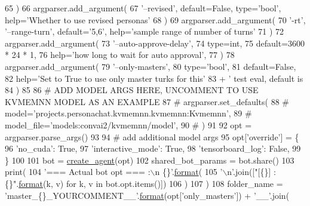 \begin{DoxyCode}
65     )
66     argparser.add\_argument(
67         \textcolor{stringliteral}{'--revised'}, default=\textcolor{keyword}{False}, type=\textcolor{stringliteral}{'bool'}, help=\textcolor{stringliteral}{'Whether to use revised personas'}
68     )
69     argparser.add\_argument(
70         \textcolor{stringliteral}{'-rt'}, \textcolor{stringliteral}{'--range-turn'}, default=\textcolor{stringliteral}{'5,6'}, help=\textcolor{stringliteral}{'sample range of number of turns'}
71     )
72     argparser.add\_argument(
73         \textcolor{stringliteral}{'--auto-approve-delay'},
74         type=int,
75         default=3600 * 24 * 1,
76         help=\textcolor{stringliteral}{'how long to wait for auto approval'},
77     )
78     argparser.add\_argument(
79         \textcolor{stringliteral}{'--only-masters'},
80         type=\textcolor{stringliteral}{'bool'},
81         default=\textcolor{keyword}{False},
82         help=\textcolor{stringliteral}{'Set to True to use only master turks for this'}
83         + \textcolor{stringliteral}{' test eval, default is %
84     )
85 
86     \textcolor{comment}{# ADD MODEL ARGS HERE, UNCOMMENT TO USE KVMEMNN MODEL AS AN EXAMPLE}
87     \textcolor{comment}{# argparser.set\_defaults(}
88     \textcolor{comment}{#     model='projects.personachat.kvmemnn.kvmemnn:Kvmemnn',}
89     \textcolor{comment}{#     model\_file='models:convai2/kvmemnn/model',}
90     \textcolor{comment}{# )}
91 
92     opt = argparser.parse\_args()
93 
94     \textcolor{comment}{# add additional model args}
95     opt[\textcolor{stringliteral}{'override'}] = \{
96         \textcolor{stringliteral}{'no\_cuda'}: \textcolor{keyword}{True},
97         \textcolor{stringliteral}{'interactive\_mode'}: \textcolor{keyword}{True},
98         \textcolor{stringliteral}{'tensorboard\_log'}: \textcolor{keyword}{False},
99     \}
100 
101     bot = \hyperlink{namespaceparlai_1_1core_1_1agents_ad0d54074d4bcc148bb415ab5515a53b5}{create\_agent}(opt)
102     shared\_bot\_params = bot.share()
103     print(
104         \textcolor{stringliteral}{'=== Actual bot opt === :\(\backslash\)n \{\}'}.\hyperlink{namespaceparlai_1_1chat__service_1_1services_1_1messenger_1_1shared__utils_a32e2e2022b824fbaf80c747160b52a76}{format}(
105             \textcolor{stringliteral}{'\(\backslash\)n'}.join([\textcolor{stringliteral}{"[\{\}] : \{\}"}.\hyperlink{namespaceparlai_1_1chat__service_1_1services_1_1messenger_1_1shared__utils_a32e2e2022b824fbaf80c747160b52a76}{format}(k, v) \textcolor{keywordflow}{for} k, v \textcolor{keywordflow}{in} bot.opt.items()])
106         )
107     )
108     folder\_name = \textcolor{stringliteral}{'master\_\{\}\_YOURCOMMENT\_\_'}.\hyperlink{namespaceparlai_1_1chat__service_1_1services_1_1messenger_1_1shared__utils_a32e2e2022b824fbaf80c747160b52a76}{format}(opt[\textcolor{stringliteral}{'only\_masters'}]) + \textcolor{stringliteral}{'\_\_'}.join(
}
\end{DoxyCode}
